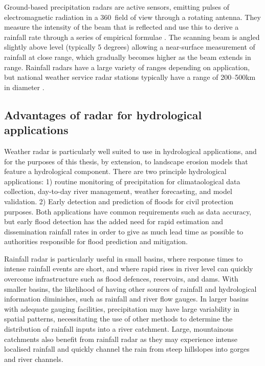 Ground-based precipitation radars are active sensors, emitting pulses of electromagnetic radiation in a 360\degree \ field of view through a rotating antenna. They measure the intensity of the beam that is reflected and use this to derive a rainfall rate through a series of empirical formulae \citep{wilson1979radar}. The scanning beam is angled slightly above level (typically 5 degrees) allowing a near-surface measurement of rainfall at close range, which gradually becomes higher as the beam extends in range.  Rainfall radars have a large variety of ranges depending on application, but national weather service radar stations typically have a range of 200--500km in diameter \citep{fabry2015radar}.  

\subsection{Advantages of radar for hydrological applications}
Weather radar is particularly well suited to use in hydrological applications, and for the purposes of this thesis, by extension, to landscape erosion models that feature a hydrological component. There are two principle hydrological applications: 1) routine monitoring of precipitation for climataological data collection, day-to-day river management, weather forecasting, and model validation. 2) Early detection and prediction of floods for civil protection purposes. Both applications have common requirements such as data accuracy, but early flood detection has the added need for rapid estimation and dissemination rainfall rates in order to give as much lead time as possible to authorities responsible for flood prediction and mitigation. 

Rainfall radar is particularly useful in small basins, where response times to intense rainfall events are short, and where rapid rises in river level can quickly overcome infrastructure such as flood defences, reservoirs, and dams. With smaller basins, the likelihood of having other sources of rainfall and hydrological information diminishes, such as rainfall and river flow gauges. In larger basins with adequate gauging facilities, precipitation may have large variability in spatial patterns, necessitating the use of other methods to determine the distribution of rainfall inputs into a river catchment. Large, mountainous catchments also benefit from rainfall radar as they may experience intense localised rainfall and quickly channel the rain from steep hillslopes into gorges and river channels.



